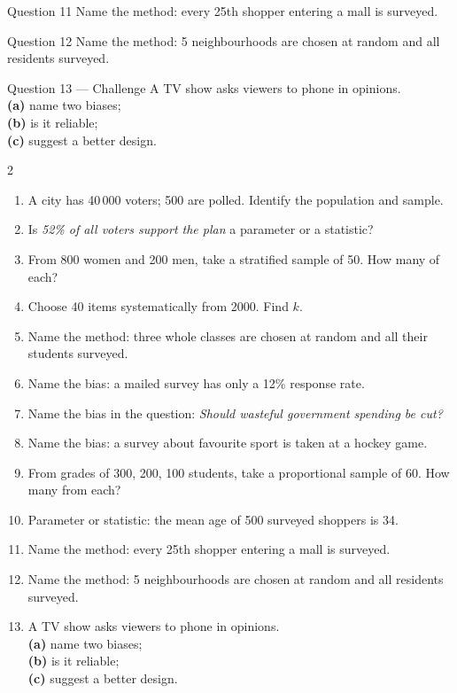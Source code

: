 \documentclass[11pt]{article}
\begin{document}
\begin{qbox}{Question 11}
Name the method: every 25th shopper entering a mall is surveyed.\workspace{2.4cm}
\end{qbox}

\begin{qbox}{Question 12}
Name the method: 5 neighbourhoods are chosen at random and all residents surveyed.\workspace{2.4cm}
\end{qbox}

\begin{qbox}{Question 13 --- Challenge}
A TV show asks viewers to phone in opinions. \\ \textbf{(a)} name two biases; \\ \textbf{(b)} is it reliable; \\ \textbf{(c)} suggest a better design.\workspace{3cm}
\end{qbox}

\clearpage
{}

\begin{recapbox}
\begin{multicols}{2}
\small
\begin{enumerate}[leftmargin=*,itemsep=3pt]
  \item A city has 40\,000 voters; 500 are polled. Identify the population and sample.
  \item Is \emph{52\% of all voters support the plan} a parameter or a statistic?
  \item From 800 women and 200 men, take a stratified sample of 50. How many of each?
  \item Choose 40 items systematically from 2000. Find $k$.
  \item Name the method: three whole classes are chosen at random and all their students surveyed.
  \item Name the bias: a mailed survey has only a 12\% response rate.
  \item Name the bias in the question: \emph{Should wasteful government spending be cut?}
  \item Name the bias: a survey about favourite sport is taken at a hockey game.
  \item From grades of 300, 200, 100 students, take a proportional sample of 60. How many from each?
  \item Parameter or statistic: the mean age of 500 surveyed shoppers is 34.
  \item Name the method: every 25th shopper entering a mall is surveyed.
  \item Name the method: 5 neighbourhoods are chosen at random and all residents surveyed.
  \item A TV show asks viewers to phone in opinions. \\ \textbf{(a)} name two biases; \\ \textbf{(b)} is it reliable; \\ \textbf{(c)} suggest a better design.
\end{enumerate}
\end{multicols}
\end{recapbox}
\end{document}
